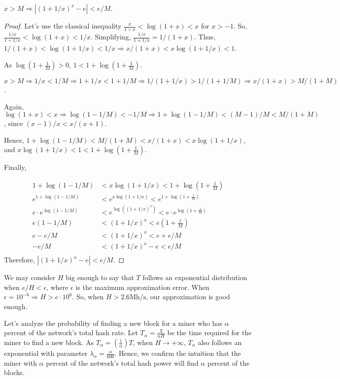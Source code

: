 \begin{theorem}
	$x > M \Rightarrow |(1+1/x)^x - e| < e/M$.
\end{theorem}
\begin{proof}
	Let's use the classical inequality $\frac{x}{1+x} < \log(1+x) < x$ for $x > -1$. So, $\frac{1/x}{1+1/x} < \log(1+x) < 1/x$. Simplifying, $\frac{1/x}{1+1/x} = 1/(1+x)$.  Thus, $1/(1+x) < \log(1+1/x) < 1/x \Rightarrow x/(1+x) < x \log(1 + 1/x) < 1$.

	As $\log(1 + \frac{1}{M}) > 0$, $1 < 1 + \log(1 + \frac{1}{M})$.

	$x > M \Rightarrow 1/x < 1/M \Rightarrow 1+1/x < 1+1/M \Rightarrow 1/(1+1/x) > 1/(1+1/M) \Rightarrow x/(1+x) > M/(1+M)$.

	Again, $\log(1+x) < x \Rightarrow \log(1-1/M) < -1/M \Rightarrow 1 + \log(1-1/M) < (M-1)/M < M/(1+M)$, since $(x-1)/x < x/(x+1)$.

	Hence, $1 + \log(1-1/M) < M/(1+M) < x/(1+x) < x\log(1+1/x)$, and $x\log(1+1/x) < 1 < 1 + \log(1 + \frac{1}{M})$.

	Finally,

	\begin{align*}
		1 + \log(1-1/M) &< x\log(1+1/x) < 1 + \log(1 + \frac{1}{M}) \\
		e^{1 + \log(1-1/M)} &< e^{x\log(1+1/x)} < e^{1 + \log(1 + \frac{1}{M})} \\
		e \cdot e^{\log(1-1/M)} &< e^{\log((1+1/x)^x)} < e \cdot e^{\log(1 + \frac{1}{M})} \\
		e(1-1/M) &< (1+1/x)^x < e(1 + \frac{1}{M}) \\
		e-e/M &< (1+1/x)^x < e + e/M \\
		-e/M &< (1+1/x)^x - e < e/M \\
	\end{align*}
	Therefore, $\left| \left( 1+1/x \right)^x - e \right| < e/M$.
\end{proof}

We may consider $H$ big enough to say that $T$ follows an exponential distribution when $e/H < \epsilon$, where $\epsilon$ is the maximum approximation error. When $\epsilon = 10^{-6} \Rightarrow H > e \cdot 10^6$. So, when $H > 2.6 \text{Mh/s}$, our approximation is good enough.

Let's analyze the probability of finding a new block for a miner who has $\alpha$ percent of the network's total hash rate. Let $T_\alpha = \frac{X}{\alpha H}$ be the time required for the miner to find a new block. As $T_\alpha = \left( \frac{1}{\alpha} \right) T$, when $H \rightarrow +\infty$, $T_\alpha$ also follows an exponential with parameter $\lambda_\alpha = \frac{\alpha}{600}$. Hence, we confirm the intuition that the miner with $\alpha$ percent of the network's total hash power will find $\alpha$ percent of the blocks.

